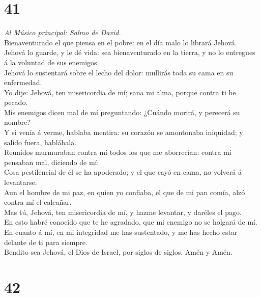 \hypertarget{section-40}{%
\section{41}\label{section-40}}

 \emph{Al Músico principal: Salmo de David.}\\
Bienaventurado el que piensa en el pobre: en el día malo lo librará
Jehová.\\
 Jehová lo guarde, y le dé vida: sea bienaventurado en la
tierra, y no lo entregues á la voluntad de sus enemigos.\\
 Jehová lo sustentará sobre el lecho del dolor: mullirás
toda su cama en su enfermedad.\\
 Yo dije: Jehová, ten misericordia de mí; sana mi alma,
porque contra ti he pecado.\\
 Mis enemigos dicen mal de mí preguntando: ¿Cuándo morirá, y
perecerá su nombre?\\
 Y si venía á verme, hablaba mentira: su corazón se
amontonaba iniquidad; y salido fuera, hablábala.\\
 Reunidos murmuraban contra mí todos los que me aborrecían:
contra mí pensaban mal, diciendo de mí:\\
 Cosa pestilencial de él se ha apoderado; y el que cayó en
cama, no volverá á levantarse.\\
 Aun el hombre de mi paz, en quien yo confiaba, el que de mi
pan comía, alzó contra mí el calcañar.\\
 Mas tú, Jehová, ten misericordia de mí, y hazme levantar,
y daréles el pago.\\
 En esto habré conocido que te he agradado, que mi enemigo
no se holgará de mí.\\
 En cuanto á mí, en mi integridad me has sustentado, y me
has hecho estar delante de ti para siempre.\\
 Bendito sea Jehová, el Dios de Israel, por siglos de
siglos. Amén y Amén.

\hypertarget{section-41}{%
\section{42}\label{section-41}}

